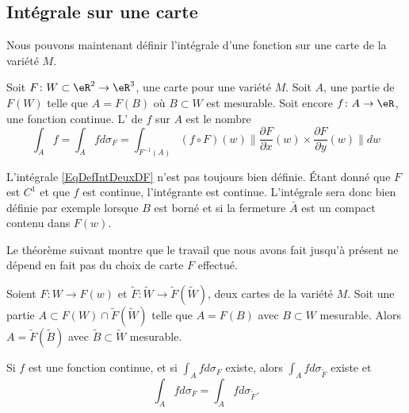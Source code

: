\subsection{Intégrale sur une carte}

Nous pouvons maintenant définir l'intégrale d'une fonction sur une carte de la variété $M$.
\begin{definition}
	Soit $F\colon W\subset \eR^2\to \eR^3$, une carte pour une variété $M$. Soit $A$, une partie de $F(W)$ telle que $A=F(B)$ où $B\subset W$ est mesurable.  Soit encore $f\colon A\to \eR$, une fonction continue. L' de $f$ sur $A$ est le nombre
	\begin{equation}	\label{EqDefIntDeuxDF}
		\int_Af=\int_Afd\sigma_F=\int_{F^{-1}(A)}(f\circ F)(w)\|  \frac{ \partial F }{ \partial x }(w)\times\frac{ \partial F }{ \partial y }(w) \| dw
	\end{equation}
\end{definition}

\begin{remark}
	L'intégrale \eqref{EqDefIntDeuxDF} n'est pas toujours bien définie. Étant donné que $F$ est $C^1$ et que $f$ est continue, l'intégrante est continue. L'intégrale sera donc bien définie par exemple lorsque $B$ est borné et si la fermeture $\bar A$ est un compact contenu dans $F(w)$.
\end{remark}

Le théorème suivant montre que le travail que nous avons fait jusqu'à présent ne dépend en fait pas du choix de carte $F$ effectué.

\begin{theorem}\label{ThoIntIndepF}
	Soient $F\colon W\to F(w)$ et $\tilde F\colon \tilde W\to \tilde F(\tilde W)$, deux cartes de la variété $M$. Soit une partie $A\subset F(W)\cap\tilde F(\tilde W)$ telle que $A=F(B)$ avec $B\subset W$ mesurable.  Alors $A=\tilde F(\tilde B)$ avec $\tilde B\subset\tilde W$ mesurable.

	Si $f$ est une fonction continue, et si $\int_Afd\sigma_F$ existe, alors $\int_Afd\sigma_{\tilde F}$ existe et
	\begin{equation}
		\int_Afd\sigma_F=\int_Afd\sigma_{\tilde F}.
	\end{equation}
\end{theorem}


